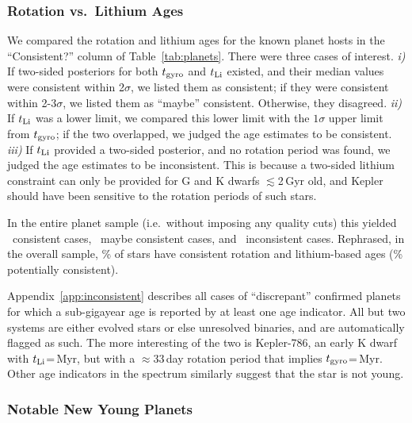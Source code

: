 \documentclass[11pt,twocolumn,tighten,linenumbers]{aastex63}
\begin{document}
\subsubsection{Rotation vs.~Lithium Ages}
\label{subsec:rotnlithiumcomp}

We compared the rotation and lithium ages for the known planet hosts
in the ``Consistent?'' column of Table~\ref{tab:planets}.  There were
three cases of interest.  {\it i)} If two-sided posteriors for both
$t_{\rm gyro}$ and $t_{\rm Li}$ existed, and their median values were
consistent within 2$\sigma$, we listed them as consistent; if they
were consistent within 2-3$\sigma$, we listed them as ``maybe''
consistent.  Otherwise, they disagreed.  {\it ii)} If $t_{\rm Li}$ was
a lower limit, we compared this lower limit with the $1\sigma$ upper
limit from $t_{\rm gyro}$; if the two overlapped, we judged the age
estimates to be consistent.  {\it iii)} If $t_{\rm Li}$ provided a
two-sided posterior, and no rotation period was found, we judged the
age estimates to be inconsistent.  This is because a two-sided lithium
constraint can only be provided for G and K dwarfs $\lesssim$2\,Gyr
old, and Kepler should have been sensitive to the rotation periods of
such stars.

In the entire planet sample (i.e.~without imposing any quality cuts)
this yielded \allagesyesconsistent\ consistent cases,
\allagesmaybeconsistent\ maybe consistent cases, and
\allagesnoconsistent\ inconsistent cases.  Rephrased, in the overall
sample, \fracconsistentallages\% of stars have consistent rotation and
lithium-based ages (\fracpotentiallyconsistentallages\% potentially
consistent).

Appendix~\ref{app:inconsistent} describes all cases of ``discrepant''
confirmed planets for which a sub-gigayear age is reported by at least
one age indicator.  All but two systems are either evolved stars or
else unresolved binaries, and are automatically flagged as such.  The
more interesting of the two is Kepler-786, an early K dwarf with
$t_{\rm Li}$=\kepseveneightsix\,Myr, but with a $\approx$33\,day
rotation period that implies $t_{\rm
gyro}$=\kepseveneightsixgyro\,Myr.  Other age indicators in the
spectrum similarly suggest that the star is not young. 



\subsubsection{Notable New Young Planets}
\label{subsec:notables}
\end{document}
